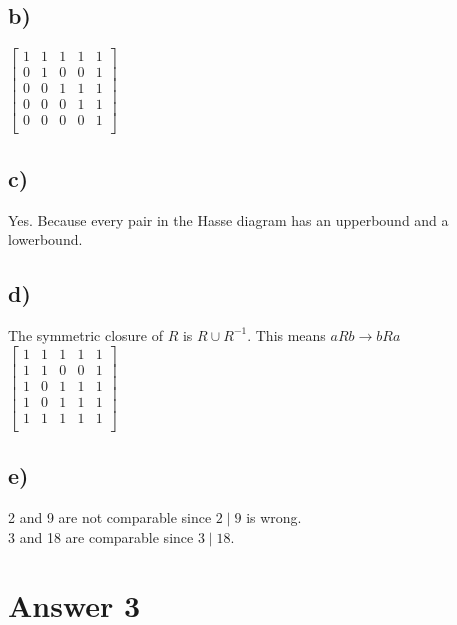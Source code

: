 \documentclass[11pt]{article}
\begin{document}
\subsection*{b)}

	$ \begin{bmatrix}
	1 & 1 & 1 & 1 & 1 \\
	0 & 1 & 0 & 0 & 1 \\
	0 & 0 & 1 & 1 & 1 \\
	0 & 0 & 0 & 1 & 1 \\
	0 & 0 & 0 & 0 & 1 \\
	\end{bmatrix} $

\subsection*{c)}

	Yes. Because every pair in the Hasse diagram has an upperbound and a lowerbound.

\subsection*{d)}
	
	The symmetric closure of $R$ is $ R \cup R^{-1} $. This means $ aRb \rightarrow bRa $ \\
	$ \begin{bmatrix}
	1 & 1 & 1 & 1 & 1 \\
	1 & 1 & 0 & 0 & 1 \\
	1 & 0 & 1 & 1 & 1 \\
	1 & 0 & 1 & 1 & 1 \\
	1 & 1 & 1 & 1 & 1 \\
	\end{bmatrix} $

\subsection*{e)}
	
	2 and 9 are not comparable since $ 2 \mid 9 $ is wrong. \\
	3 and 18 are comparable since $ 3 \mid 18 $. \\
 
\section*{Answer 3}
\end{document}
